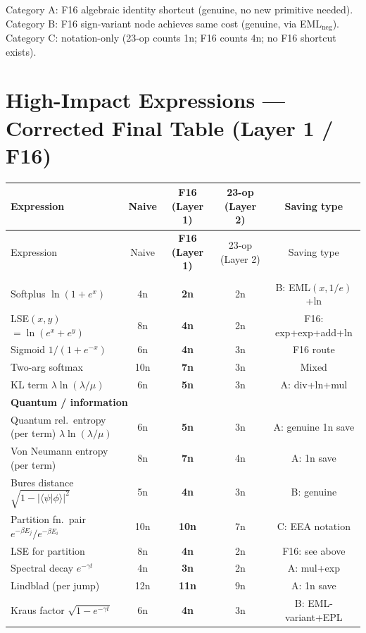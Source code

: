 \documentclass[11pt]{article}
\begin{document}
Category A: F16 algebraic identity shortcut (genuine, no new primitive needed).
Category B: F16 sign-variant node achieves same cost (genuine, via EML$_{\mathrm{neg}}$).
Category C: notation-only (23-op counts 1n; F16 counts 4n; no F16 shortcut exists).

\section{High-Impact Expressions — Corrected Final Table (Layer 1 / F16)}

\begin{longtable}{lcccc}
\toprule
Expression & Naive & \textbf{F16 (Layer 1)} & 23-op (Layer 2) & Saving type \\
\midrule
\endfirsthead
\toprule
Expression & Naive & \textbf{F16 (Layer 1)} & 23-op (Layer 2) & Saving type \\
\midrule
\endhead
\bottomrule
\endfoot
\multicolumn{5}{l}{\textbf{Smooth/ML functions}} \\
Softplus $\ln(1+e^x)$ & 4n & \textbf{2n} & 2n & B: EML$(x,1/e)$+ln \\
LSE$(x,y)$ $= \ln(e^x+e^y)$ & 8n & \textbf{4n} & 2n & F16: exp+exp+add+ln \\
Sigmoid $1/(1+e^{-x})$ & 6n & \textbf{4n} & 3n & F16 route \\
Two-arg softmax & 10n & \textbf{7n} & 3n & Mixed \\
KL term $\lambda\ln(\lambda/\mu)$ & 6n & \textbf{5n} & 3n & A: div+ln+mul \\
\midrule
\multicolumn{5}{l}{\textbf{Quantum / information}} \\
Quantum rel.\ entropy (per term) $\lambda\ln(\lambda/\mu)$ & 6n & \textbf{5n} & 3n & A: genuine 1n save \\
Von Neumann entropy (per term) & 8n & \textbf{7n} & 4n & A: 1n save \\
Bures distance $\sqrt{1-|\langle\psi|\phi\rangle|^2}$ & 5n & \textbf{4n} & 3n & B: genuine \\
Partition fn.\ pair $e^{-\beta E_j}/e^{-\beta E_i}$ & 10n & \textbf{10n} & 7n & C: EEA notation \\
LSE for partition & 8n & \textbf{4n} & 2n & F16: see above \\
Spectral decay $e^{-\gamma t}$ & 4n & \textbf{3n} & 2n & A: mul+exp \\
Lindblad (per jump) & 12n & \textbf{11n} & 9n & A: 1n save \\
Kraus factor $\sqrt{1-e^{-\gamma t}}$ & 6n & \textbf{4n} & 3n & B: EML-variant+EPL \\

\end{longtable}
\end{document}
